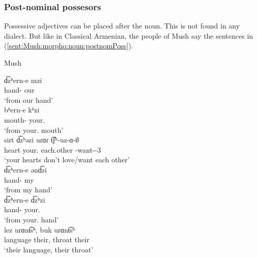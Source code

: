 
\subsubsection{Post-nominal possesors} 

Possessive adjectives can be placed after the noun. This is not found in any dialect. But like in Classical Armenian, the people of Mush say the sentences in (\ref{sent:Mush:morpho:noun:postnomPoss}).

\begin{exe}
	\ex Mush \label{sent:Mush:morpho:noun:postnomPoss}
	\begin{xlist}
		\ex \gll d͡zʰern-e mzi \\
		hand-{\abl} our \\
		\trans `from our hand' \\
		\ex \gll bʰern-e kʰzi \\
		mouth-{\abl} your.{\sg} \\
		\trans `from your.{\sg} mouth' \\
		\ex \gll siɾt d͡zʰəzi uɾɑɾ t͡ʃʰ-uz-ɑ-$\emptyset$ \\
		heart your.{\pl} each.other {\neggloss}-want-{\thgloss}-3{\sg} \\
		\trans `your hearts don't love/want each other' \\
		\ex \gll d͡zʰern-e ənd͡zi \\
		hand-{\abl} my \\
		\trans `from my hand' \\
		\ex \gll d͡zʰern-e d͡zʰzi \\
		hand-{\abl} your.{\pl} \\
		\trans `from your.{\pl} hand' \\
		\ex \gll lez uɾɑnt͡sʰ, buk uɾɑnt͡sʰ \\
		language their, throat their \\ 
		\trans `their language, their throat' \\
		
	\end{xlist}
\end{exe}

